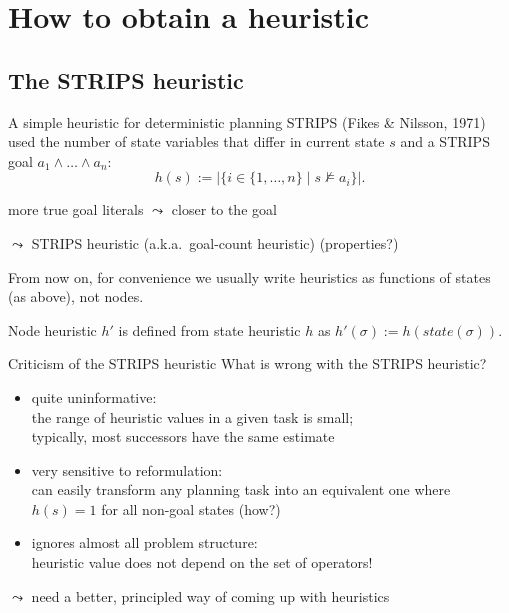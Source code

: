 \documentclass{gkibeamer}
\begin{document}
\subtitle{Planning as search: relaxed planning tasks}
\date{November 18th, 2011}
\maketitles

\section[Obtaining heuristics]{How to obtain a heuristic}
\subsection[STRIPS heuristic]{The STRIPS heuristic}

\begin{frame}{A simple heuristic for deterministic planning}
  STRIPS (Fikes \& Nilsson, 1971) used the number of state
  variables that differ in current state $s$ and a
  STRIPS goal $a_1 \land \dots \land a_n$:
  \[ h(s) := |\{ i \in \{1, \dots, n\} \mid s \not\models a_i
      \}|. \]

   more true goal literals $\leadsto$ closer to the
  goal

  \medskip

  $\leadsto$ \alert{STRIPS heuristic (a.k.a.\ goal-count heuristic)} (properties?)

  \bigskip

   From now on, for convenience we usually write
  heuristics as functions of states (as above), not nodes.

  Node heuristic $h'$ is defined from state heuristic $h$ as
  $h'(\sigma) := h(\textit{state}(\sigma))$.
\end{frame}

\begin{frame}{Criticism of the STRIPS heuristic}
  What is wrong with the STRIPS heuristic?
  \begin{itemize}
  \item quite \alert{uninformative}: \\
    the range of heuristic values in a given task is small; \\
    typically, most successors have the same estimate
  \item very sensitive to \alert{reformulation}: \\
    can easily transform any planning task into an equivalent one
    where $h(s) = 1$ for all non-goal states (how?)
  \item ignores almost all \alert{problem structure}: \\
    heuristic value does not depend on the set of operators!
  \end{itemize}

  $\leadsto$ need a better, principled way of coming up with
  heuristics
\end{frame}
\end{document}
